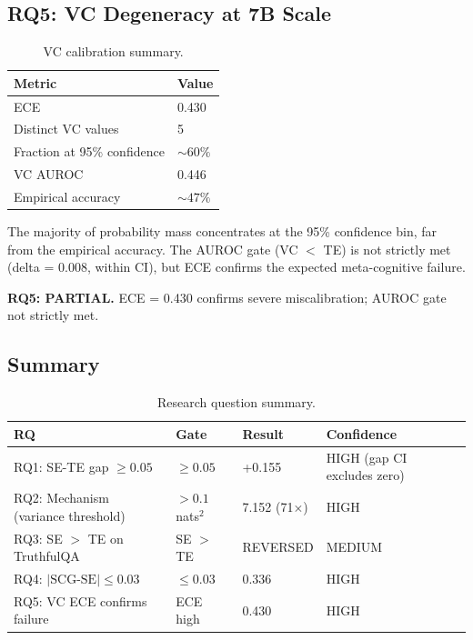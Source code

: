 \subsection{RQ5: VC Degeneracy at 7B Scale}

\begin{table}[t]
\caption{VC calibration summary.}
\label{tab:rq5}
\centering
\small
\begin{tabular}{ll}
\toprule
Metric & Value \\
\midrule
ECE & 0.430 \\
Distinct VC values & 5 \\
Fraction at 95\% confidence & ${\sim}60\%$ \\
VC AUROC & 0.446 \\
Empirical accuracy & ${\sim}47\%$ \\
\bottomrule
\end{tabular}
\end{table}

The majority of probability mass concentrates at the 95\% confidence bin, far from the empirical accuracy.
The AUROC gate (VC $<$ TE) is not strictly met (delta = 0.008, within CI), but ECE confirms the expected meta-cognitive failure.

\textbf{RQ5: PARTIAL.} ECE = 0.430 confirms severe miscalibration; AUROC gate not strictly met.

\subsection{Summary}

\begin{table}[t]
\caption{Research question summary.}
\label{tab:summary}
\centering
\small
\begin{tabular}{lllll}
\toprule
RQ & Gate & Result & Confidence \\
\midrule
RQ1: SE-TE gap $\geq 0.05$ & $\geq 0.05$ & +0.155 & HIGH (gap CI excludes zero) \\
RQ2: Mechanism (variance threshold) & $> 0.1$ nats$^2$ & 7.152 (71$\times$) & HIGH \\
RQ3: SE $>$ TE on TruthfulQA & SE $>$ TE & REVERSED & MEDIUM \\
RQ4: $|\text{SCG-SE}| \leq 0.03$ & $\leq 0.03$ & 0.336 & HIGH \\
RQ5: VC ECE confirms failure & ECE high & 0.430 & HIGH \\
\bottomrule
\end{tabular}
\end{table}
